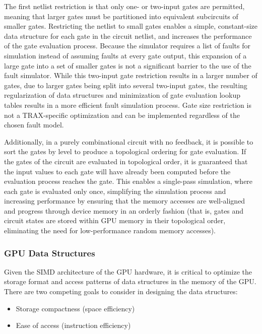 The first netlist restriction is that only one- or two-input gates are permitted, meaning that larger gates must be partitioned into equivalent subcircuits of smaller gates.
%
Restricting the netlist to small gates enables a simple, constant-size data structure for each gate in the circuit netlist, and increases the performance of the gate evaluation process.
%
Because the simulator requires a list of faults for simulation instead of assuming faults at every gate output, this expansion of a large gate into a set of smaller gates is not a significant barrier to the use of the fault simulator.
%
While this two-input gate restriction results in a larger number of gates, due to larger gates being split into several two-input gates, the resulting regularization of data structures and minimization of gate evaluation lookup tables results in a more efficient fault simulation process.
%
Gate size restriction is not a TRAX-specific optimization and can be implemented regardless of the chosen fault model.

Additionally, in a purely combinational circuit with no feedback, it is possible to sort the gates by level to produce a topological ordering for gate evaluation.
%
If the gates of the circuit are evaluated in topological order, it is guaranteed that the input values to each gate will have already been computed before the evaluation process reaches the gate.
%
This enables a single-pass simulation, where each gate is evaluated only once, simplifying the simulation process and increasing performance by ensuring that the memory accesses are well-aligned and progress through device memory in an orderly fashion (that is, gates and circuit states are stored within GPU memory in their topological order, eliminating the need for low-performance random memory accesses).%

\subsubsection{GPU Data Structures}
Given the SIMD architecture of the GPU hardware, it is critical to optimize the storage format and access patterns of data structures in the memory of the GPU.
%
There are two competing goals to consider in designing the data structures:

\begin{itemize}
\item Storage compactness (space efficiency)
\item Ease of access (instruction efficiency)
\end{itemize}

